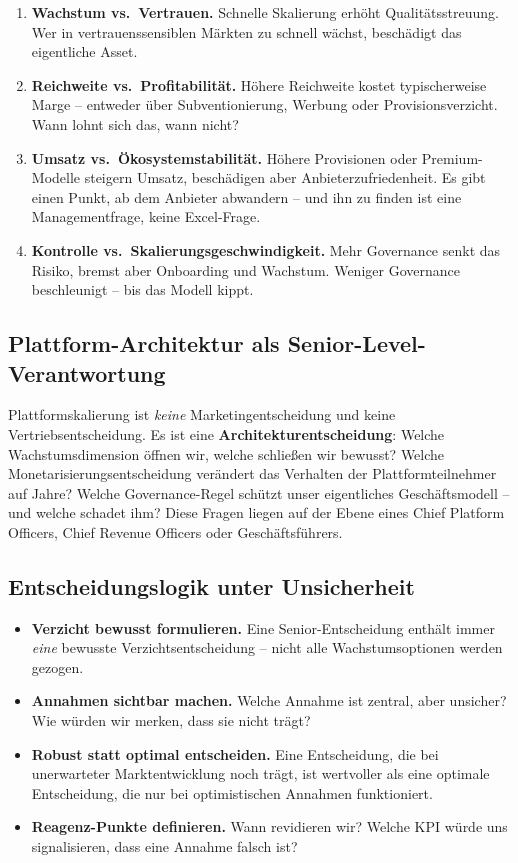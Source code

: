 \documentclass[11pt,a4paper,oneside]{article}
\newcommand{\fachbegriff}[1]{\textbf{#1}}
\begin{document}
\begin{enumerate}
  \item \textbf{Wachstum vs.\ Vertrauen.} Schnelle Skalierung erhöht Qualitätsstreuung. Wer in vertrauenssensiblen Märkten zu schnell wächst, beschädigt das eigentliche Asset.
  \item \textbf{Reichweite vs.\ Profitabilität.} Höhere Reichweite kostet typischerweise Marge -- entweder über Subventionierung, Werbung oder Provisionsverzicht. Wann lohnt sich das, wann nicht?
  \item \textbf{Umsatz vs.\ Ökosystemstabilität.} Höhere Provisionen oder Premium-Modelle steigern Umsatz, beschädigen aber Anbieterzufriedenheit. Es gibt einen Punkt, ab dem Anbieter abwandern -- und ihn zu finden ist eine Managementfrage, keine Excel-Frage.
  \item \textbf{Kontrolle vs.\ Skalierungsgeschwindigkeit.} Mehr Governance senkt das Risiko, bremst aber Onboarding und Wachstum. Weniger Governance beschleunigt -- bis das Modell kippt.
\end{enumerate}

\subsection{Plattform-Architektur als Senior-Level-Verantwortung}

Plattformskalierung ist \emph{keine} Marketingentscheidung und keine Vertriebsentscheidung. Es ist eine \fachbegriff{Architekturentscheidung}: Welche Wachstumsdimension öffnen wir, welche schließen wir bewusst? Welche Monetarisierungsentscheidung verändert das Verhalten der Plattformteilnehmer auf Jahre? Welche Governance-Regel schützt unser eigentliches Geschäftsmodell -- und welche schadet ihm? Diese Fragen liegen auf der Ebene eines Chief Platform Officers, Chief Revenue Officers oder Geschäftsführers.

\subsection{Entscheidungslogik unter Unsicherheit}

\begin{itemize}
  \item \textbf{Verzicht bewusst formulieren.} Eine Senior-Entscheidung enthält immer \emph{eine} bewusste Verzichtsentscheidung -- nicht alle Wachstumsoptionen werden gezogen.
  \item \textbf{Annahmen sichtbar machen.} Welche Annahme ist zentral, aber unsicher? Wie würden wir merken, dass sie nicht trägt?
  \item \textbf{Robust statt optimal entscheiden.} Eine Entscheidung, die bei unerwarteter Marktentwicklung noch trägt, ist wertvoller als eine optimale Entscheidung, die nur bei optimistischen Annahmen funktioniert.
  \item \textbf{Reagenz-Punkte definieren.} Wann revidieren wir? Welche KPI würde uns signalisieren, dass eine Annahme falsch ist?
\end{itemize}
\end{document}
